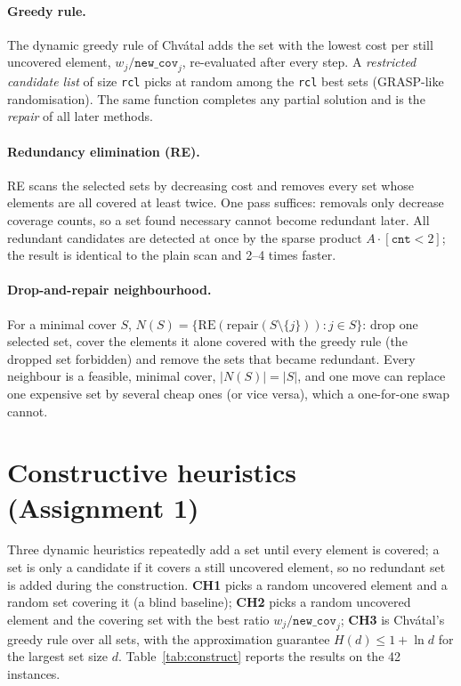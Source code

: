 \documentclass[11pt,a4paper]{article}
\begin{document}
\paragraph{Greedy rule.} The dynamic greedy rule of Chv\'atal \cite{chvatal1979} adds the set with the lowest cost per still uncovered element, $w_j/\texttt{new\_cov}_j$, re-evaluated after every step. A \emph{restricted candidate list} of size \texttt{rcl} picks at random among the \texttt{rcl} best sets (GRASP-like randomisation). The same function completes any partial solution and is the \emph{repair} of all later methods.

\paragraph{Redundancy elimination (RE).} RE scans the selected sets by decreasing cost and removes every set whose elements are all covered at least twice. One pass suffices: removals only decrease coverage counts, so a set found necessary cannot become redundant later. All redundant candidates are detected at once by the sparse product $A\cdot[\texttt{cnt}<2]$; the result is identical to the plain scan and 2--4 times faster.

\paragraph{Drop-and-repair neighbourhood.} For a minimal cover $S$, $N(S)=\{\mathrm{RE}(\mathrm{repair}(S\setminus\{j\})) : j\in S\}$: drop one selected set, cover the elements it alone covered with the greedy rule (the dropped set forbidden) and remove the sets that became redundant.
Every neighbour is a feasible, minimal cover, $|N(S)|=|S|$, and one move can replace one expensive set by several cheap ones (or vice versa), which a one-for-one swap cannot.

\section{Constructive heuristics (Assignment 1)}\label{sec:construct}
Three dynamic heuristics repeatedly add a set until every element is covered; a set is only a candidate if it covers a still uncovered element, so no redundant set is added during the construction.
\textbf{CH1} picks a random uncovered element and a random set covering it (a blind baseline); \textbf{CH2} picks a random uncovered element and the covering set with the best ratio $w_j/\texttt{new\_cov}_j$; \textbf{CH3} is Chv\'atal's greedy rule over all sets, with the approximation guarantee $H(d)\le 1+\ln d$ for the largest set size $d$.
Table~\ref{tab:construct} reports the results on the 42 instances.
\end{document}
